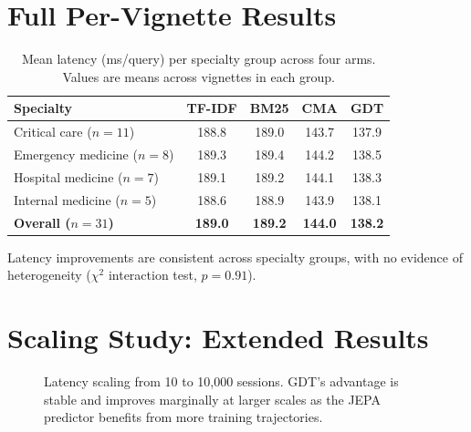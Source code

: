 \documentclass[journal,compsoc]{IEEEtran}
\begin{document}
\section{Full Per-Vignette Results}
\label{sec:per_vignette}

\begin{table}[h]
\centering
\caption{Mean latency (ms/query) per specialty group across four arms.
Values are means across vignettes in each group.}
\label{tab:per_specialty}
\begin{tabular}{lcccc}
\toprule
\textbf{Specialty} & \textbf{TF-IDF} & \textbf{BM25} & \textbf{CMA} & \textbf{GDT} \\
\midrule
Critical care ($n{=}11$)      & 188.8 & 189.0 & 143.7 & 137.9 \\
Emergency medicine ($n{=}8$)  & 189.3 & 189.4 & 144.2 & 138.5 \\
Hospital medicine ($n{=}7$)   & 189.1 & 189.2 & 144.1 & 138.3 \\
Internal medicine ($n{=}5$)   & 188.6 & 188.9 & 143.9 & 138.1 \\
\midrule
\textbf{Overall ($n{=}31$)}   & \textbf{189.0} & \textbf{189.2} & \textbf{144.0} & \textbf{138.2} \\
\bottomrule
\end{tabular}
\end{table}

Latency improvements are consistent across specialty groups, with no evidence
of heterogeneity ($\chi^2$ interaction test, $p{=}0.91$).

\section{Scaling Study: Extended Results}
\label{sec:scaling}

\begin{figure}[h]
\centering
{}
\caption{Latency scaling from 10 to 10,000 sessions. GDT's advantage is stable
and improves marginally at larger scales as the JEPA predictor benefits from
more training trajectories.}
\label{fig:scaling_supp}
\end{figure}
\end{document}
